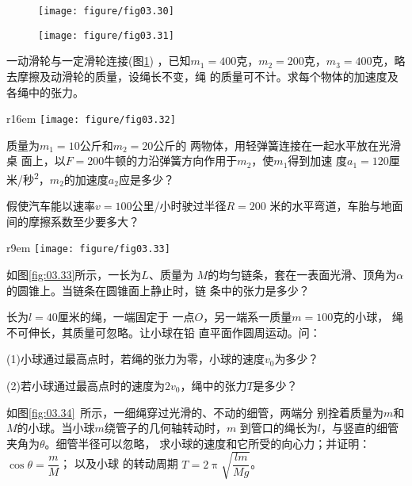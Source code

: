 \documentclass[../outline-of-mechanics.tex]{subfiles}
\begin{document}
\begin{exercises}
\begin{figure}[h]
  \begin{minipage}[b]{0.4\linewidth}
    \centering
    \texttt{[image: figure/fig03.30]}
    \caption{}
    \label{fig:03.30}
  \end{minipage}
  \begin{minipage}[b]{0.6\linewidth}
    \centering
    \texttt{[image: figure/fig03.31]}
    \caption{}
    \label{fig:03.31}
  \end{minipage}
  \vspace{-1.56em}
\end{figure}
\exercise 一动滑轮与一定滑轮连接(图\ref{fig:03.31}) ，已知$ m _ { 1 } = 4 0 0 $克，$ m _ { 2 } = 2 0 0 $克，$ m _ { 3 } = 4 0 0 $克，略去摩擦及动滑轮的质量，设绳长不变，绳
的质量可不计。求每个物体的加速度及各绳中的张力。

\begin{wrapfigure}[4]{r}{16em}
  \centering
  \texttt{[image: figure/fig03.32]}
  \caption{}
  \label{fig:03.32}
\end{wrapfigure}
\exercise 质量为$ m _ { 1 } = 1 0 $公斤和$ m _ { 2 } = 2 0 $公斤的
两物体，用轻弹簧连接在一起水平放在光滑桌
面上，以$ F = 2 0 0 $牛顿的力沿弹簧方向作用于$ m _ { 2 } $，使$ m _ { 1 } $得到加速
度$ a _ { 1 } = 1 2 0 $厘米/秒\textsuperscript{2}，$ m _ { 2 } $的加速度$ a _ { 2 } $应是多少？

\exercise 假使汽车能以速率$ v = 1 0 0 $公里/小时驶过半径$ R = 2 0 0 $
米的水平弯道，车胎与地面间的摩擦系数至少要多大？

\begin{wrapfigure}[10]{r}{9em}
  \centering
  \texttt{[image: figure/fig03.33]}
  \caption{}
  \label{fig:03.33}
\end{wrapfigure}
\exercise 如图\ref{fig:03.33}所示，一长为$ L $、质量为
$ M $的均匀链条，套在一表面光滑、顶角为$ \alpha $
的圆锥上。当链条在圆锥面上静止时，链
条中的张力是多少？

\exercise 长为$ l = 4 0 $厘米的绳，一端固定于
一点$ O $，另一端系一质量$ m = 1 0 0 $克的小球，
绳不可伸长，其质量可忽略。让小球在铅
直平面作圆周运动。问：

(1)小球通过最高点时，若绳的张力为零，小球的速度$ v _ { 0 } $为多少？

(2)若小球通过最高点时的速度为$ 2 v _ { 0 } $，绳中的张力$ T $是多少？

\exercise 如图\ref{fig:03.34}~所示，一细绳穿过光滑的、不动的细管，两端分
别拴着质量为$ m $和$ M $的小球。当小球$ m $绕管子的几何轴转动时，$ m $
到管口的绳长为$ l $，与竖直的细管夹角为$ \theta $。细管半径可以忽略，
求小球的速度和它所受的向心力；并证明：$ \cos \theta = \dfrac { m } { M } $； 以及小球
的转动周期
$ T = 2 \uppi \sqrt{\dfrac { l m } { M g }} $。


\end{exercises}
\end{document}
